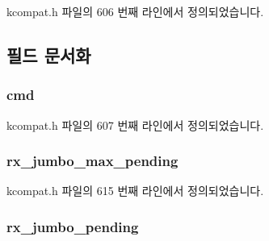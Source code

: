 kcompat.\+h 파일의 606 번째 라인에서 정의되었습니다.



\subsection{필드 문서화}
\subsubsection[{\texorpdfstring{cmd}{cmd}}]{ cmd}\hypertarget{struct__kc__ethtool__ringparam_a62fe2a1dbf17d5a8561a5a7f5a97a9ba}{}\label{struct__kc__ethtool__ringparam_a62fe2a1dbf17d5a8561a5a7f5a97a9ba}


kcompat.\+h 파일의 607 번째 라인에서 정의되었습니다.

\subsubsection[{\texorpdfstring{rx\+\_\+jumbo\+\_\+max\+\_\+pending}{rx_jumbo_max_pending}}]{ rx\+\_\+jumbo\+\_\+max\+\_\+pending}\hypertarget{struct__kc__ethtool__ringparam_ab0ee44b964940e97aa1aec25c6446344}{}\label{struct__kc__ethtool__ringparam_ab0ee44b964940e97aa1aec25c6446344}


kcompat.\+h 파일의 615 번째 라인에서 정의되었습니다.

\subsubsection[{\texorpdfstring{rx\+\_\+jumbo\+\_\+pending}{rx_jumbo_pending}}]{ rx\+\_\+jumbo\+\_\+pending}\hypertarget{struct__kc__ethtool__ringparam_a9ae1fecc302e941aa7d73852cab2e659}{}\label{struct__kc__ethtool__ringparam_a9ae1fecc302e941aa7d73852cab2e659}


